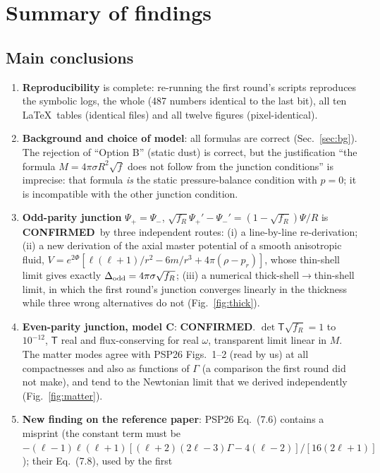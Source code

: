 \documentclass[11pt,a4paper]{article}
\newcommand{\sq}{\sqrt{f_R}}
\newcommand{\OK}{\textcolor{green!50!black}{\textbf{CONFIRMED}}}
\newcommand{\file}[1]{{\small\path{#1}}}
\begin{document}
\section{Summary of findings}\label{sec:summary}
\subsection{Main conclusions}
\begin{enumerate}
\item \textbf{Reproducibility} is complete: re-running the first round's scripts reproduces the symbolic logs,
the whole \file{validation.json} (487 numbers identical to the last bit), all ten \LaTeX\ tables (identical
files) and all twelve figures (pixel-identical).
\item \textbf{Background and choice of model}: all formulas are correct (Sec.~\ref{sec:bg}). The rejection of
``Option B'' (static dust) is correct, but the justification ``the formula $M=4\pi\sigma R^2\sqrt f$ does not follow
from the junction conditions'' is imprecise: that formula \emph{is} the static pressure-balance condition with
$p=0$; it is incompatible with the other junction condition.
\item \textbf{Odd-parity junction} $\Psi_+=\Psi_-$, $\sq\Psi_+'-\Psi_-'=(1-\sq)\Psi/R$ is \OK\ by three independent
routes: (i) a line-by-line re-derivation; (ii) a new derivation of the axial master potential of a smooth
anisotropic fluid, $V=e^{2\Phi}[\ell(\ell+1)/r^2-6m/r^3+4\pi(\rho-p_r)]$, whose thin-shell limit gives exactly
$\Delta_{\rm odd}=4\pi\sigma\sq$; (iii) a numerical thick-shell$\to$thin-shell limit, in which the first round's
junction converges linearly in the thickness while three wrong alternatives do not (Fig.~\ref{fig:thick}).
\item \textbf{Even-parity junction, model C}: \OK. $\det\mathsf T\sq=1$ to $10^{-12}$, $\mathsf T$ real and
flux-conserving for real $\omega$, transparent limit linear in $M$. The matter modes agree with PSP26 Figs.~1--2
(read by us) at all compactnesses and also as functions of $\Gamma$ (a comparison the first round did not make),
and tend to the Newtonian limit that we derived independently (Fig.~\ref{fig:matter}).
\item \textbf{New finding on the reference paper}: PSP26 Eq.~(7.6) contains a misprint (the constant term must be
$-(\ell-1)\ell(\ell+1)[(\ell+2)(2\ell-3)\Gamma-4(\ell-2)]/[16(2\ell+1)]$); their Eq.~(7.8), used by the first

\end{enumerate}
\end{document}
